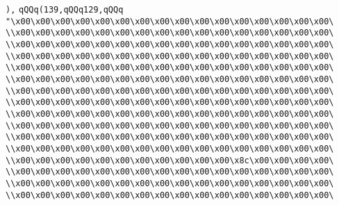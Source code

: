 \verb|),|\newline
\verb|qQQq(139,qQQq129,qQQq|\newline
\verb|"\x00\x00\x00\x00\x00\x00\x00\x00\x00\x00\x00\x00\x00\x00\x00\x00\|\newline
\verb|\\x00\x00\x00\x00\x00\x00\x00\x00\x00\x00\x00\x00\x00\x00\x00\x00\|\newline
\verb|\\x00\x00\x00\x00\x00\x00\x00\x00\x00\x00\x00\x00\x00\x00\x00\x00\|\newline
\verb|\\x00\x00\x00\x00\x00\x00\x00\x00\x00\x00\x00\x00\x00\x00\x00\x00\|\newline
\verb|\\x00\x00\x00\x00\x00\x00\x00\x00\x00\x00\x00\x00\x00\x00\x00\x00\|\newline
\verb|\\x00\x00\x00\x00\x00\x00\x00\x00\x00\x00\x00\x00\x00\x00\x00\x00\|\newline
\verb|\\x00\x00\x00\x00\x00\x00\x00\x00\x00\x00\x00\x00\x00\x00\x00\x00\|\newline
\verb|\\x00\x00\x00\x00\x00\x00\x00\x00\x00\x00\x00\x00\x00\x00\x00\x00\|\newline
\verb|\\x00\x00\x00\x00\x00\x00\x00\x00\x00\x00\x00\x00\x00\x00\x00\x00\|\newline
\verb|\\x00\x00\x00\x00\x00\x00\x00\x00\x00\x00\x00\x00\x00\x00\x00\x00\|\newline
\verb|\\x00\x00\x00\x00\x00\x00\x00\x00\x00\x00\x00\x00\x00\x00\x00\x00\|\newline
\verb|\\x00\x00\x00\x00\x00\x00\x00\x00\x00\x00\x00\x00\x00\x00\x00\x00\|\newline
\verb|\\x00\x00\x00\x00\x00\x00\x00\x00\x00\x00\x00\x8c\x00\x00\x00\x00\|\newline
\verb|\\x00\x00\x00\x00\x00\x00\x00\x00\x00\x00\x00\x00\x00\x00\x00\x00\|\newline
\verb|\\x00\x00\x00\x00\x00\x00\x00\x00\x00\x00\x00\x00\x00\x00\x00\x00\|\newline
\verb|\\x00\x00\x00\x00\x00\x00\x00\x00\x00\x00\x00\x00\x00\x00\x00\x00\|\newline
